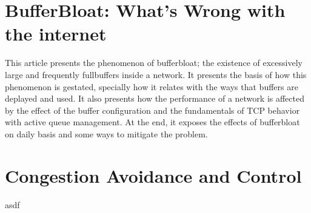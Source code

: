 \documentclass{article}
\begin{document}


\section{BufferBloat: What's Wrong with the internet \cite{GettysNichols}}
This article presents the phenomenon of bufferbloat; the existence of excessively large and frequently fullbuffers inside a network. It presents the basis of how this phenomenon is gestated, specially how it relates with the ways that buffers are deplayed and used. It also presents how the performance of a network is affected by the effect of the buffer configuration and the fundamentals of TCP behavior with active queue management. At the end, it exposes the effects of bufferbloat on daily basis and some ways to mitigate the problem.    

\section{Congestion Avoidance and Control \cite{Jacobson88congestionavoidance}}

asdf


{}
\end{document}
